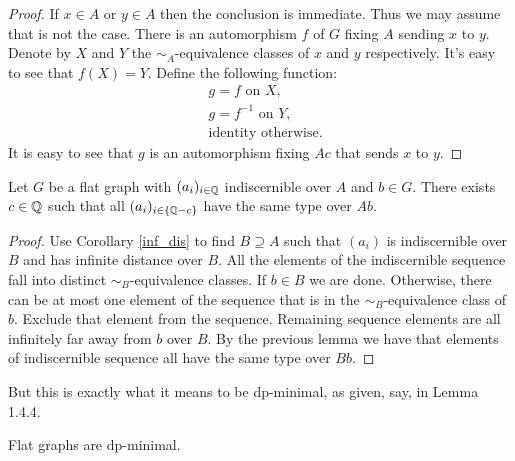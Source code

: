 \begin{proof}
  If $x \in A$ or $y \in A$ then the conclusion is immediate.
  Thus we may assume that is not the case.
  There is an automorphism $f$ of $G$ fixing $A$ sending $x$ to $y$.
  Denote by $X$ and $Y$ the $\sim_A$-equivalence classes of $x$ and $y$ respectively.
  It's easy to see that $f(X) = Y$. Define the following function:
  \begin{align*}
    &g = f \text { on } X, \\
    &g = f^{-1} \text { on } Y, \\
    &\text{identity otherwise.}
  \end{align*}
  It is easy to see that $g$ is an automorphism fixing $Ac$ that sends $x$ to $y$.
\end{proof}

\begin{Theorem}
  Let $G$ be a flat graph with $(a_i)_{i\in\mathbb{Q}}$ indiscernible over $A$ and $b \in G$.
  There exists $c \in \mathbb{Q}$ such that all $(a_i)_{i\in\{\mathbb{Q} - c\}}$ have the same type over $Ab$.
\end{Theorem}

\begin{proof}
  Use Corollary \ref{inf_dis} to find $B \supseteq A$ such that $(a_i)$ is indiscernible over $B$ and has infinite distance over $B$.
  All the elements of the indiscernible sequence fall into distinct $\sim_B$-equivalence classes.
  If $b \in B$ we are done.
  Otherwise, there can be at most one element of the sequence that is in the $\sim_B$-equivalence class of $b$.
  Exclude that element from the sequence.
  Remaining sequence elements are all infinitely far away from $b$ over $B$.
  By the previous lemma we have that elements of indiscernible sequence all have the same type over $Bb$.
\end{proof}

But this is exactly what it means to be dp-minimal, as given, say, in \cite{simon_dp_min} Lemma 1.4.4.

\begin{Corollary}
  Flat graphs are dp-minimal.
\end{Corollary}
